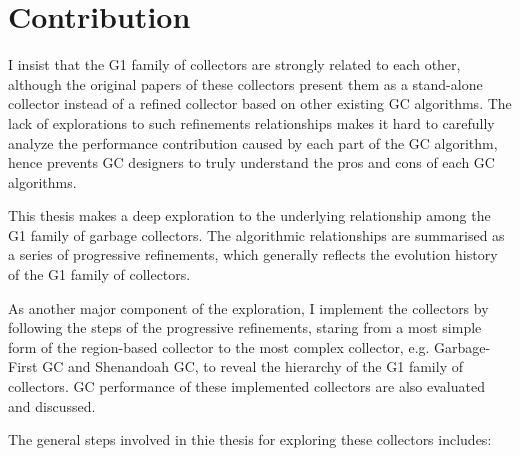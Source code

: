 

\section{Contribution}

I insist that the G1 family of collectors are strongly related to each other,
although the original papers of these collectors present them as a stand-alone collector
instead of a refined collector based on other existing GC algorithms. The lack of
explorations to such refinements relationships makes it hard to carefully analyze
the performance contribution caused by each part of the GC algorithm, hence prevents
GC designers to truly understand the pros and cons of each GC algorithms.

This thesis makes a deep exploration to the underlying relationship among the
G1 family of garbage collectors. The algorithmic relationships are summarised
as a series of progressive refinements, which generally reflects the evolution
history of the G1 family of collectors.

As another major component of the exploration, I implement the collectors by following
the steps of the progressive refinements, staring from a most simple form of the
region-based collector to the most complex collector, e.g. Garbage-First GC and
Shenandoah GC, to reveal the hierarchy of the G1 family of collectors.
GC performance of these implemented collectors are also evaluated and discussed.

The general steps involved in thie thesis for exploring these collectors includes:

